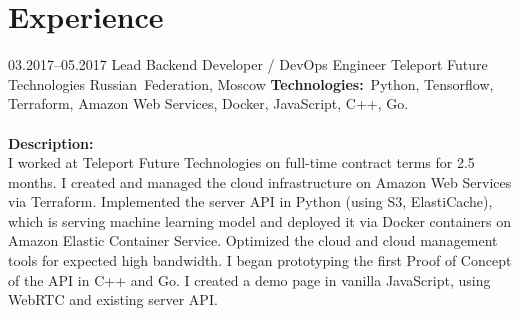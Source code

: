 \documentclass[12pt,a4paper,final]{moderncv}
\begin{document}
\section{Experience}

\cventry
{03.2017--05.2017}
{Lead Backend Developer / DevOps Engineer}
{Teleport Future Technologies}
{Russian~Federation, Moscow}
{}
{
  \textbf{Technologies:}~Python, Tensorflow, Terraform, Amazon Web Services, Docker, JavaScript, C++, Go.
  \\\\
  \textbf{Description:}\\
  {\parindent=1cm
    I worked at Teleport Future Technologies on full-time contract terms for 2.5 months. I created and managed the cloud infrastructure on Amazon Web Services via Terraform. Implemented the server API in Python (using S3, ElastiCache), which is serving machine learning model and deployed it via Docker containers on Amazon Elastic Container Service. Optimized the cloud and cloud management tools for expected high bandwidth. I began prototyping the first Proof of Concept of the API in C++ and Go. I created a demo page in vanilla JavaScript, using WebRTC and existing server API.
  }
}
\end{document}
